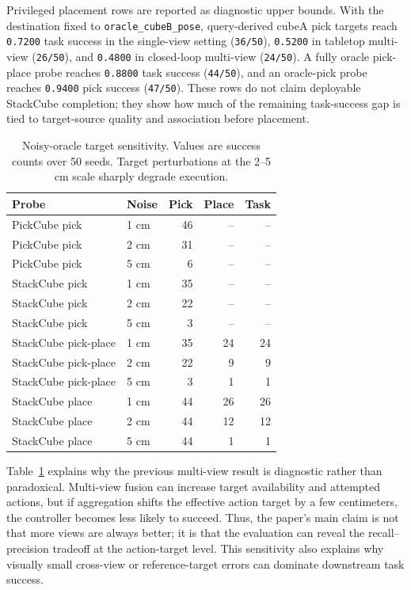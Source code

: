 \documentclass[conference]{IEEEtran}
\begin{document}
Privileged placement rows are reported as diagnostic upper bounds. With the
destination fixed to \texttt{oracle\_cubeB\_pose}, query-derived cubeA pick
targets reach \texttt{0.7200} task success in the single-view setting
(\texttt{36/50}), \texttt{0.5200} in tabletop multi-view (\texttt{26/50}), and
\texttt{0.4800} in closed-loop multi-view (\texttt{24/50}). A fully oracle
pick-place probe reaches \texttt{0.8800} task success (\texttt{44/50}), and an
oracle-pick probe reaches \texttt{0.9400} pick success (\texttt{47/50}). These
rows do not claim deployable StackCube completion; they show how much of the
remaining task-success gap is tied to target-source quality and association
before placement.

\begin{table}[t]
\centering
\caption{Noisy-oracle target sensitivity. Values are success counts over 50
seeds. Target perturbations at the 2--5 cm scale sharply degrade execution.}
\label{tab:noisy-oracle}
\scriptsize
\setlength{\tabcolsep}{3.2pt}
\begin{tabular}{llrrr}
\toprule
Probe & Noise & Pick & Place & Task \\
\midrule
PickCube pick & 1 cm & 46 & -- & -- \\
PickCube pick & 2 cm & 31 & -- & -- \\
PickCube pick & 5 cm & 6 & -- & -- \\
StackCube pick & 1 cm & 35 & -- & -- \\
StackCube pick & 2 cm & 22 & -- & -- \\
StackCube pick & 5 cm & 3 & -- & -- \\
StackCube pick-place & 1 cm & 35 & 24 & 24 \\
StackCube pick-place & 2 cm & 22 & 9 & 9 \\
StackCube pick-place & 5 cm & 3 & 1 & 1 \\
StackCube place & 1 cm & 44 & 26 & 26 \\
StackCube place & 2 cm & 44 & 12 & 12 \\
StackCube place & 5 cm & 44 & 1 & 1 \\
\bottomrule
\end{tabular}
\end{table}

Table~\ref{tab:noisy-oracle} explains why the previous multi-view result is
diagnostic rather than paradoxical. Multi-view fusion can increase target
availability and attempted actions, but if aggregation shifts the effective
action target by a few centimeters, the controller becomes less likely to
succeed. Thus, the paper's main claim is not that more views are always better;
it is that the evaluation can reveal the recall--precision tradeoff at the
action-target level. This sensitivity also explains why visually small
cross-view or reference-target errors can dominate downstream task success.
\end{document}
